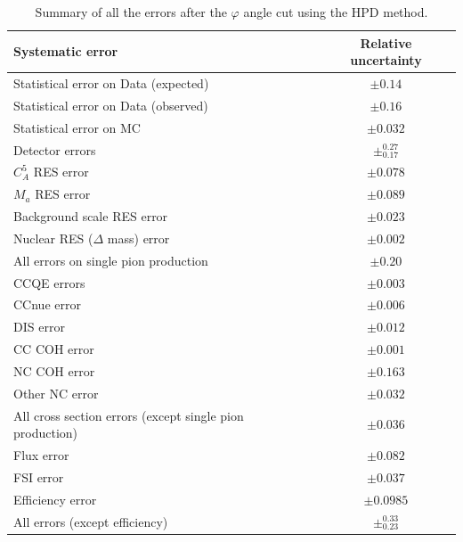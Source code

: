 \begin{table}[ht]
  \begin{adjustbox}{center}
    \begin{tabular}{lc}
      \toprule
      Systematic error &Relative uncertainty \\ 
      \midrule
      Statistical error on Data (expected) & $\pm 0.14$ \\ 
      Statistical error on Data (observed) & $\pm 0.16$ \\ 
      Statistical error on \Gls{MC}        & $\pm 0.032$ \\ 
      \midrule
      Detector errors                      & $\pm^{0.27}_{0.17}$\\ 
      \midrule
      $C_{A}^{5}$ \Gls{RES} error              &$\pm0.078$ \\ 
      $M_{a}$ \Gls{RES} error                 &$\pm0.089$ \\ 
      Background scale \Gls{RES} error        &$\pm0.023$\\ 
      Nuclear \Gls{RES} ($\Delta$ mass) error &$\pm0.002$\\ 
      \midrule                                
      All errors on single pion production    &$\pm0.20$\\ 
      \midrule
      \Gls{CCQE} errors        & $\pm 0.003 $\\ 
      \Gls{CC}\Gls{nue} error  & $\pm 0.006 $\\ 
      \Gls{DIS} error          & $\pm 0.012 $\\ 
      \Gls{CC} \Gls{COH} error & $\pm 0.001 $\\ 
      \Gls{NC} \Gls{COH} error & $\pm 0.163 $\\ 
      Other \Gls{NC} error     & $\pm 0.032 $\\ 
      \midrule
      All cross section errors (except single pion production) & $\pm 0.036$\\ 
      \midrule
      Flux error & $\pm 0.082$\\ 
      \midrule
      \Gls{FSI} error & $\pm 0.037$\\
      \midrule
      Efficiency error & $\pm 0.0985$ \\
      \midrule
      All errors (except efficiency) & $\pm^{0.33}_{0.23}$ \\ 
      \bottomrule
    \end{tabular}
  \end{adjustbox}
  \caption[Summary of all the errors after the $\varphi$ angle
  cut]{Summary of all the errors after the $\varphi$ angle cut using
    the \Gls{HPD} method.}
  \label{tab:AllErrorPhiCut}
\end{table}


